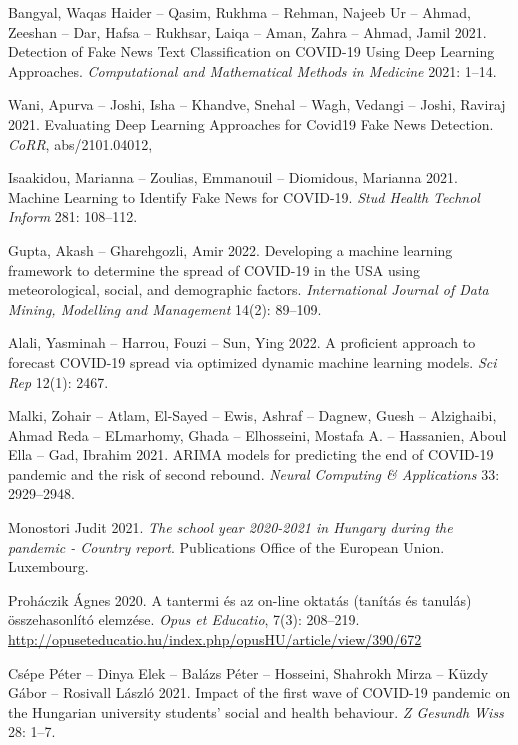 \documentclass[12pt]{article}
\begin{document}
\begin{thebibliography}{9}
Bangyal, Waqas Haider -- Qasim, Rukhma -- Rehman, Najeeb Ur -- Ahmad, Zeeshan -- Dar, Hafsa -- Rukhsar, Laiqa -- Aman, Zahra -- Ahmad, Jamil 2021. Detection of Fake News Text Classification on COVID-19 Using Deep Learning Approaches. \textit{Computational and Mathematical Methods in Medicine} 2021: 1--14.  %

Wani, Apurva -- Joshi, Isha -- Khandve, Snehal -- Wagh, Vedangi --  Joshi, Raviraj 2021. Evaluating Deep Learning Approaches for Covid19 Fake News Detection. \textit{CoRR}, abs/2101.04012,  %

Isaakidou, Marianna -- Zoulias, Emmanouil -- Diomidous, Marianna 2021. Machine Learning to Identify Fake News for COVID-19. \textit{Stud Health Technol Inform} 281: 108--112. 

Gupta, Akash -- Gharehgozli, Amir 2022. Developing a machine learning framework to determine the spread of COVID-19 in the USA using meteorological, social, and demographic factors. \textit{International Journal of Data Mining, Modelling and Management} 14(2): 89--109. 

Alali, Yasminah -- Harrou, Fouzi -- Sun, Ying 2022. A proficient approach to forecast COVID-19 spread via optimized dynamic machine learning models. \textit{Sci Rep} 12(1): 2467. 

Malki, Zohair -- Atlam, El-Sayed -- Ewis, Ashraf -- Dagnew, Guesh -- Alzighaibi, Ahmad Reda -- ELmarhomy, Ghada -- Elhosseini, Mostafa A. -- Hassanien, Aboul Ella -- Gad, Ibrahim 2021. ARIMA models for predicting the end of COVID-19 pandemic and the risk of second rebound. \textit{Neural Computing \& Applications} 33: 2929--2948.

Monostori Judit 2021. \textit{The school year 2020-2021 in Hungary during the pandemic - Country report}. Publications Office of the European Union. Luxembourg. 

Proháczik Ágnes 2020. A tantermi és az on-line oktatás (tanítás és tanulás) összehasonlító elemzése. \textit{Opus et Educatio}, 7(3): 208--219.  \url{http://opuseteducatio.hu/index.php/opusHU/article/view/390/672}

Csépe Péter -- Dinya Elek -- Balázs Péter -- Hosseini, Shahrokh Mirza -- Küzdy Gábor -- Rosivall László 2021. Impact of the first wave of COVID-19 pandemic on the Hungarian university students' social and health behaviour. \textit{Z Gesundh Wiss} 28: 1--7. 


\end{thebibliography}
\end{document}
